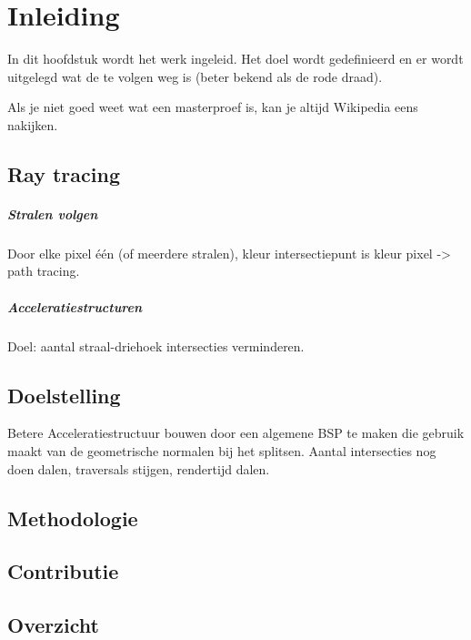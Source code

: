 \chapter{Inleiding}
\label{hoofdstuk:inleiding}
In dit hoofdstuk wordt het werk ingeleid. Het doel wordt gedefinieerd en er
wordt uitgelegd wat de te volgen weg is (beter bekend als de rode draad).

Als je niet goed weet wat een masterproef is, kan je altijd
Wikipedia eens nakijken.

\section{Ray tracing}
    \paragraph{Stralen volgen}
    Door elke pixel één (of meerdere stralen), kleur intersectiepunt is kleur pixel -> path tracing.
    \paragraph{Acceleratiestructuren}
    Doel: aantal straal-driehoek intersecties verminderen.
\section{Doelstelling}
Betere Acceleratiestructuur bouwen door een algemene BSP te maken die gebruik maakt van de geometrische normalen bij het splitsen. 
Aantal intersecties nog doen dalen, traversals stijgen, rendertijd dalen.
\section{Methodologie}
\section{Contributie}
\section{Overzicht}

